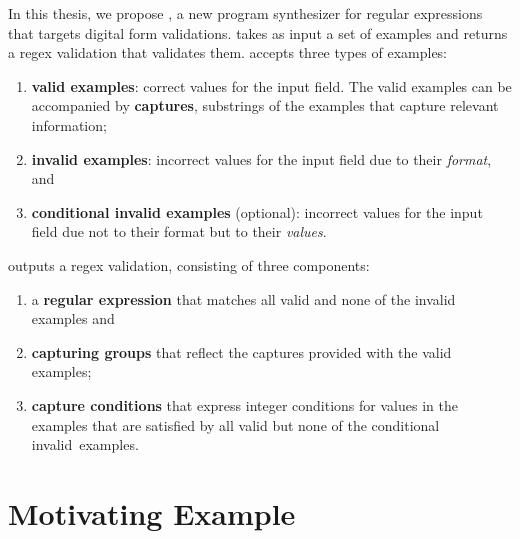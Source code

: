 In this thesis, we propose \Forest{}, a new program synthesizer for regular expressions that targets digital form validations.
\Forest takes as input a set of examples and returns a regex validation that validates them.
\Forest accepts three types of examples:
\begin{enumerate}%
    \item \textbf{valid examples}: correct values for the input field. The valid examples can be accompanied by \textbf{captures}, substrings of the examples that capture relevant information;
    \item \textbf{invalid examples}: incorrect values for the input field due to their \textit{format}, and
    \item \textbf{conditional invalid examples} (optional): incorrect values for the input field due not to their format but to their \textit{values}.
\end{enumerate}
%
\Forest outputs a regex validation, consisting of three components:
\begin{enumerate}%
    \item a \textbf{regular expression} that matches all valid and none of the invalid examples and
    \item \textbf{capturing groups} that reflect the captures provided with the valid examples;
    \item \textbf{capture conditions} that express integer conditions for values in the examples that are satisfied by all valid but none of the conditional invalid~examples.
\end{enumerate}

\section{Motivating Example}\label{sec:motivating-example}

